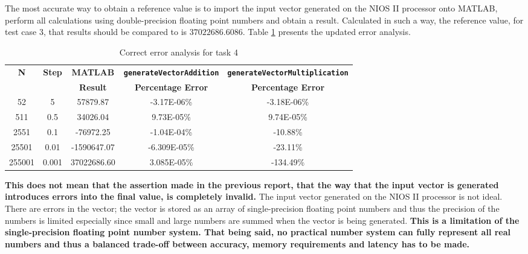 \documentclass{article}
\begin{document}
The most accurate way to obtain a reference value is to import the input vector generated on the NIOS II processor onto MATLAB, perform all calculations using double-precision floating point numbers and obtain a result. Calculated in such a way, the reference value, for test case 3, that results should be compared to is $37022686.6086$. Table \ref{tab:report_2_correct_table} presents the updated error analysis.


\begin{table}[H]
  \centering
    \begin{tabular}{|c|c|c|c|c|}
    \hline
    \multirow{2}{*}{\textbf{N}} & \multirow{2}{*}{\textbf{Step}} & \textbf{MATLAB} & \textbf{{\tt generateVectorAddition}} & \textbf{{\tt generateVectorMultiplication}} \\
    \cline{4-5}          &       & \textbf{Result} & \textbf{Percentage Error} & \textbf{Percentage Error} \\
    \hline
    52    & 5     & 57879.87 & -3.17E-06\% & -3.18E-06\% \\
    \hline
    511   & 0.5   & 34026.04 & 9.73E-05\% & 9.74E-05\% \\
    \hline
    2551  & 0.1   & -76972.25 & -1.04E-04\% & -10.88\% \\
    \hline
    25501 & 0.01  & -1590647.07 & -6.309E-05\% & -23.11\% \\
    \hline
    255001 & 0.001 & 37022686.60 & 3.085E-05\% & -134.49\% \\
    \hline
    \end{tabular}%
  \caption{Correct error analysis for task 4}
  \label{tab:report_2_correct_table}
\end{table}%


\textbf{This does not mean that the assertion made in the previous report, that the way that the input vector is generated introduces errors into the final value, is completely invalid.} The input vector generated on the NIOS II processor is not ideal. There are errors in the vector; the vector is stored as an array of single-precision floating point numbers and thus the precision of the numbers is limited especially since small and large numbers are summed when the vector is being generated. \textbf{This is a limitation of the single-precision floating point number system. That being said, no practical number system can fully represent all real numbers and thus a balanced trade-off between accuracy, memory requirements and latency has to be made.}\\ 
\end{document}

